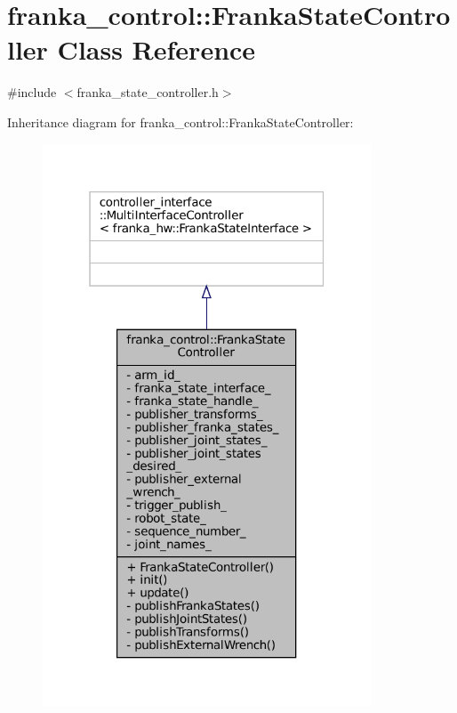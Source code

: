 \hypertarget{classfranka__control_1_1FrankaStateController}{}\section{franka\+\_\+control\+:\+:Franka\+State\+Controller Class Reference}
\label{classfranka__control_1_1FrankaStateController}


{\ttfamily \#include $<$franka\+\_\+state\+\_\+controller.\+h$>$}



Inheritance diagram for franka\+\_\+control\+:\+:Franka\+State\+Controller\+:
\nopagebreak
\begin{figure}[H]
\begin{center}
\leavevmode
\includegraphics[width=277pt]{classfranka__control_1_1FrankaStateController__inherit__graph}
\end{center}
\end{figure}


